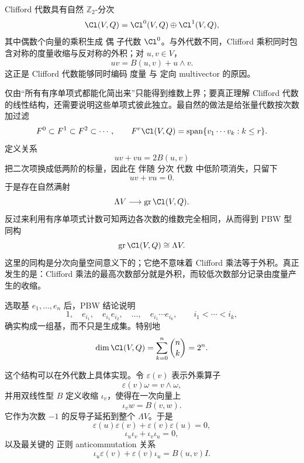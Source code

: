 Clifford 代数具有自然 $\mathbb Z_2$-分次
\[
\Cl(V,Q)
=
\Cl^0(V,Q)
\oplus
\Cl^1(V,Q),
\]
其中偶数个向量的乘积生成 偶 子代数 $\Cl^0$。与外代数不同，Clifford 乘积同时包含对称的度量收缩与反对称的外积；对 $u,v\in V$，
\[
uv=B(u,v)+u\wedge v.
\]
这正是 Clifford 代数能够同时编码 度量 与 定向 multivector 的原因。

仅由“所有有序单项式都能化简出来”只能得到维数上界；要真正理解 Clifford 代数的线性结构，还需要说明这些单项式彼此独立。最自然的做法是给张量代数按次数加过滤
\[
F^0\subset F^1\subset F^2\subset\cdots,
\qquad
F^r\Cl(V,Q)
=\operatorname{span}\{v_1\cdots v_k:k\le r\}.
\]
定义关系
\[
uv+vu=2B(u,v)
\]
把二次项换成低两阶的标量，因此在 伴随 分次 代数 中低阶项消失，只留下
\[
uv+vu=0.
\]
于是存在自然满射
\[
\Lambda V\longrightarrow
\operatorname{gr}\Cl(V,Q).
\]
反过来利用有序单项式计数可知两边各次数的维数完全相同，从而得到 PBW 型同构
\begin{equation}
\operatorname{gr}\Cl(V,Q)
\cong \Lambda V.
\label{eq:clifford-pbw-graded}
\end{equation}
这里的同构是分次向量空间意义下的；它绝不意味着 Clifford 乘法等于外积。真正发生的是：Clifford 乘法的最高次数部分就是外积，而较低次数部分记录由度量产生的收缩。

选取基 $e_1,\ldots,e_n$ 后，PBW 结论说明
\begin{equation}
1,
\quad e_{i_1},
\quad e_{i_1}e_{i_2},
\quad\ldots,\quad
e_{i_1}\cdots e_{i_k},
\qquad i_1<\cdots<i_k,
\label{eq:clifford-pbw-basis}
\end{equation}
确实构成一组基，而不只是生成集。特别地
\[
\dim\Cl(V,Q)=\sum_{k=0}^n\binom nk=2^n.
\]

这个结构可以在外代数上具体实现。令 $\varepsilon(v)$ 表示外乘算子
\[
\varepsilon(v)\omega=v\wedge\omega,
\]
并用双线性型 $B$ 定义收缩 $\iota_v$，使得在一次向量上
\[
\iota_v w=B(v,w).
\]
它作为次数 $-1$ 的反导子延拓到整个 $\Lambda V$。于是
\[
\varepsilon(u)\varepsilon(v)+\varepsilon(v)\varepsilon(u)=0,
\]
\[
\iota_u\iota_v+\iota_v\iota_u=0,
\]
以及最关键的 正则 anticommutation 关系
\begin{equation}
\iota_u\varepsilon(v)+\varepsilon(v)\iota_u
=B(u,v)I.
\label{eq:clifford-wedge-contraction-car}
\end{equation}

